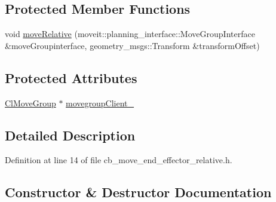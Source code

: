 \subsection*{Protected Member Functions}
\begin{DoxyCompactItemize}
\item 
void \hyperlink{classmove__group__interface__client_1_1CbMoveEndEffectorRelative_a8f64d14c4a398b455b1953ae61cc58bc}{move\+Relative} (moveit\+::planning\+\_\+interface\+::\+Move\+Group\+Interface \&move\+Groupinterface, geometry\+\_\+msgs\+::\+Transform \&transform\+Offset)
\end{DoxyCompactItemize}
\subsection*{Protected Attributes}
\begin{DoxyCompactItemize}
\item 
\hyperlink{classmove__group__interface__client_1_1ClMoveGroup}{Cl\+Move\+Group} $\ast$ \hyperlink{classmove__group__interface__client_1_1CbMoveEndEffectorRelative_a979ec9c309b1b52a0d0e254b49865fdc}{movegroup\+Client\+\_\+}
\end{DoxyCompactItemize}


\subsection{Detailed Description}


Definition at line 14 of file cb\+\_\+move\+\_\+end\+\_\+effector\+\_\+relative.\+h.



\subsection{Constructor \& Destructor Documentation}
\mbox{\label{classmove__group__interface__client_1_1CbMoveEndEffectorRelative_a935f6349f0ab3b762ed6365d35634a0b}} 
